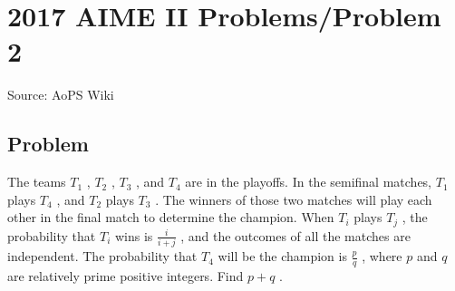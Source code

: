 \documentclass[12pt]{article}
\begin{document}
\section*{{2017 AIME II Problems/Problem 2}}
Source: AoPS Wiki

\subsection*{Problem}
The teams $T_1$ , $T_2$ , $T_3$ , and $T_4$ are in the playoffs. In the semifinal matches, $T_1$ plays $T_4$ , and $T_2$ plays $T_3$ . The winners of those two matches will play each other in the final match to determine the champion. When $T_i$ plays $T_j$ , the probability that $T_i$ wins is $\frac{i}{i+j}$ , and the outcomes of all the matches are independent. The probability that $T_4$ will be the champion is $\frac{p}{q}$ , where $p$ and $q$ are relatively prime positive integers. Find $p+q$ .
\end{document}
